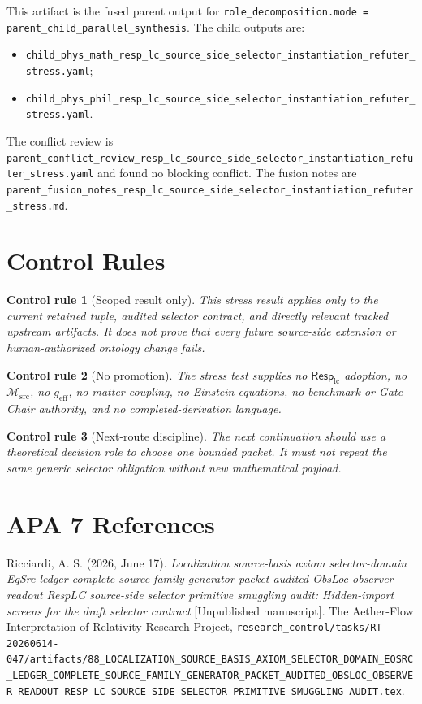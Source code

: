 \documentclass[11pt]{article}
\newcommand{\Msrc}{\mathcal{M}_{\mathrm{src}}}
\newcommand{\RespLC}{\mathsf{Resp}_{\mathrm{lc}}}
\newcommand{\geff}{g_{\mathrm{eff}}}
\newtheorem{controlrule}{Control rule}
\begin{document}
This artifact is the fused parent output for
\texttt{role\_decomposition.mode = parent\_child\_parallel\_synthesis}.
The child outputs are:
\begin{itemize}
    \item \texttt{child\_phys\_math\_resp\_lc\_source\_side\_selector\_instantiation\_refuter\_stress.yaml};
    \item \texttt{child\_phys\_phil\_resp\_lc\_source\_side\_selector\_instantiation\_refuter\_stress.yaml}.
\end{itemize}
The conflict review is
\texttt{parent\_conflict\_review\_resp\_lc\_source\_side\_selector\_instantiation\_refuter\_stress.yaml}
and found no blocking conflict. The fusion notes are
\texttt{parent\_fusion\_notes\_resp\_lc\_source\_side\_selector\_instantiation\_refuter\_stress.md}.

\section{Control Rules}

\begin{controlrule}[Scoped result only]
This stress result applies only to the current retained tuple,
audited selector contract, and directly relevant tracked upstream
artifacts. It does not prove that every future source-side extension
or human-authorized ontology change fails.
\end{controlrule}

\begin{controlrule}[No promotion]
The stress test supplies no \(\RespLC\) adoption, no \(\Msrc\), no
\(\geff\), no matter coupling, no Einstein equations, no benchmark or
Gate Chair authority, and no completed-derivation language.
\end{controlrule}

\begin{controlrule}[Next-route discipline]
The next continuation should use a theoretical decision role to choose
one bounded packet. It must not repeat the same generic selector
obligation without new mathematical payload.
\end{controlrule}

\section*{APA 7 References}

Ricciardi, A. S. (2026, June 17). \emph{Localization source-basis
axiom selector-domain EqSrc ledger-complete source-family generator
packet audited ObsLoc observer-readout RespLC source-side selector
primitive smuggling audit: Hidden-import screens for the draft
selector contract} [Unpublished manuscript]. The Aether-Flow
Interpretation of Relativity Research Project,
\texttt{research\_control/tasks/RT-20260614-047/artifacts/88\_LOCALIZATION\_SOURCE\_BASIS\_AXIOM\_SELECTOR\_DOMAIN\_EQSRC\_LEDGER\_COMPLETE\_SOURCE\_FAMILY\_GENERATOR\_PACKET\_AUDITED\_OBSLOC\_OBSERVER\_READOUT\_RESP\_LC\_SOURCE\_SIDE\_SELECTOR\_PRIMITIVE\_SMUGGLING\_AUDIT.tex}.
\end{document}
